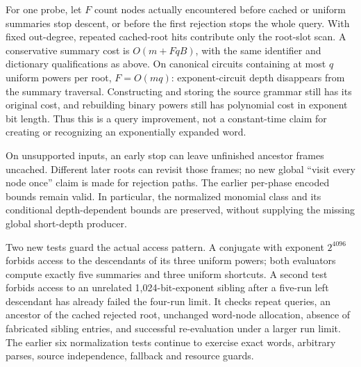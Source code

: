 For one probe, let $F$ count nodes actually encountered before cached or
uniform summaries stop descent, or before the first rejection stops the
whole query. With fixed out-degree, repeated cached-root hits contribute
only the root-slot scan. A conservative summary cost is
$O(m+FqB)$, with the same identifier and dictionary qualifications as above.
On canonical circuits containing at most $q$ uniform powers per root,
$F=O(mq)$: exponent-circuit depth disappears from the summary traversal.
Constructing and storing the source grammar still has its original cost,
and rebuilding binary powers still has polynomial cost in exponent bit
length. Thus this is a query improvement, not a constant-time claim for
creating or recognizing an exponentially expanded word.

On unsupported inputs, an early stop can leave unfinished ancestor frames
uncached. Different later roots can revisit those frames; no new global
``visit every node once'' claim is made for rejection paths. The earlier
per-phase encoded bounds remain valid. In particular, the normalized
monomial class and its conditional depth-dependent bounds are preserved,
without supplying the missing global short-depth producer.

Two new tests guard the actual access pattern. A conjugate with exponent
$2^{4096}$ forbids access to the descendants of its three uniform powers;
both evaluators compute exactly five summaries and three uniform shortcuts.
A second test forbids access to an unrelated 1,024-bit-exponent sibling
after a five-run left descendant has already failed the four-run limit.
It checks repeat queries, an ancestor of the cached rejected root, unchanged
word-node allocation, absence of fabricated sibling entries, and successful
re-evaluation under a larger run limit. The earlier six normalization tests
continue to exercise exact words, arbitrary parses, source independence,
fallback and resource guards.


